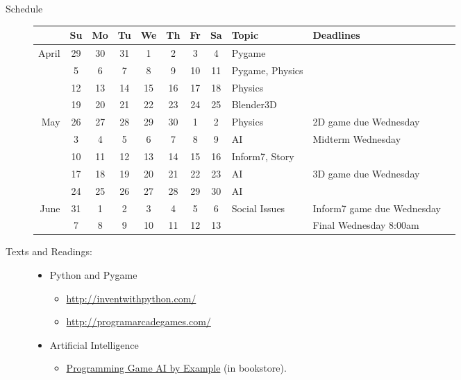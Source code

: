 \documentclass{article}
\begin{document}
\begin{description}
\begin{multicols}{2}
\begin{centering}
\end{centering}
\end{multicols}


\item [Schedule]\mbox{}

\begin{tabular}{r|ccccccc|lll}                      
&Su& Mo& Tu& We& Th& Fr& Sa&Topic & Deadlines \\\hline  
April
&29& 30& 31&  1&  2&  3&  4& Pygame\\
& 5&  6&  7&  8&  9& 10& 11& Pygame, Physics\\
&12& 13& 14& 15& 16& 17& 18& Physics\\
&19& 20& 21& 22& 23& 24& 25& Blender3D\\
May &26& 27& 28& 29& 30&1  &2  & Physics & 2D game due Wednesday\\
& 3&  4&  5&  6&  7&  8&  9& AI & Midterm Wednesday\\
&10& 11& 12& 13& 14& 15& 16& Inform7, Story\\
&17& 18& 19& 20& 21& 22& 23& AI & 3D game due Wednesday\\
&24& 25& 26& 27& 28& 29& 30& AI\\
June
&31  &  1&  2&  3&  4&  5&  6& Social Issues & Inform7 game due Wednesday\\
& 7&  8&  9& 10& 11& 12& 13&& Final Wednesday 8:00am \\
\end{tabular}


\item[Texts and Readings:] \mbox{}
\begin{itemize}

\item Python and Pygame
\begin{itemize}
 \item \url{http://inventwithpython.com/}
\item \url{http://programarcadegames.com/}
\end{itemize}

\item{Artificial Intelligence}
\begin{itemize}
\item \href{http://www.ai-junkie.com/books/toc_pgaibe.html}
{Programming Game AI by Example} (in bookstore).

\end{itemize}


\end{itemize}
\end{description}
\end{document}

